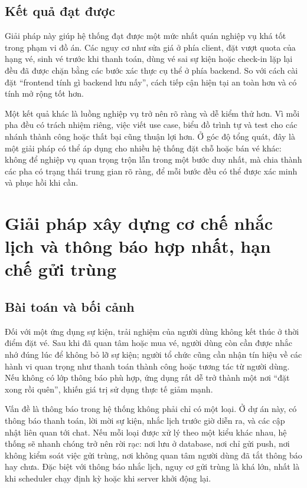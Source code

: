 \documentclass[../DoAn.tex]{subfiles}
\begin{document}
\subsection{Kết quả đạt được}
Giải pháp này giúp hệ thống đạt được một mức nhất quán nghiệp vụ khá tốt trong phạm vi đồ án. Các nguy cơ như sửa giá ở phía client, đặt vượt quota của hạng vé, sinh vé trước khi thanh toán, dùng vé sai sự kiện hoặc check-in lặp lại đều đã được chặn bằng các bước xác thực cụ thể ở phía backend. So với cách cài đặt “frontend tính gì backend lưu nấy”, cách tiếp cận hiện tại an toàn hơn và có tính mở rộng tốt hơn.

Một kết quả khác là luồng nghiệp vụ trở nên rõ ràng và dễ kiểm thử hơn. Vì mỗi pha đều có trách nhiệm riêng, việc viết use case, biểu đồ trình tự và test cho các nhánh thành công hoặc thất bại cũng thuận lợi hơn. Ở góc độ tổng quát, đây là một giải pháp có thể áp dụng cho nhiều hệ thống đặt chỗ hoặc bán vé khác: không để nghiệp vụ quan trọng trộn lẫn trong một bước duy nhất, mà chia thành các pha có trạng thái trung gian rõ ràng, để mỗi bước đều có thể được xác minh và phục hồi khi cần.

\section{Giải pháp xây dựng cơ chế nhắc lịch và thông báo hợp nhất, hạn chế gửi trùng}
\label{sec:solution-reminder-notification}

\subsection{Bài toán và bối cảnh}
Đối với một ứng dụng sự kiện, trải nghiệm của người dùng không kết thúc ở thời điểm đặt vé. Sau khi đã quan tâm hoặc mua vé, người dùng còn cần được nhắc nhớ đúng lúc để không bỏ lỡ sự kiện; người tổ chức cũng cần nhận tín hiệu về các hành vi quan trọng như thanh toán thành công hoặc tương tác từ người dùng. Nếu không có lớp thông báo phù hợp, ứng dụng rất dễ trở thành một nơi “đặt xong rồi quên”, khiến giá trị sử dụng thực tế giảm mạnh.

Vấn đề là thông báo trong hệ thống không phải chỉ có một loại. Ở dự án này, có thông báo thanh toán, lời mời sự kiện, nhắc lịch trước giờ diễn ra, và các cập nhật liên quan tới chat. Nếu mỗi loại được xử lý theo một kiểu khác nhau, hệ thống sẽ nhanh chóng trở nên rời rạc: nơi lưu ở database, nơi chỉ gửi push, nơi không kiểm soát việc gửi trùng, nơi không quan tâm người dùng đã tắt thông báo hay chưa. Đặc biệt với thông báo nhắc lịch, nguy cơ gửi trùng là khá lớn, nhất là khi scheduler chạy định kỳ hoặc khi server khởi động lại.
\end{document}
